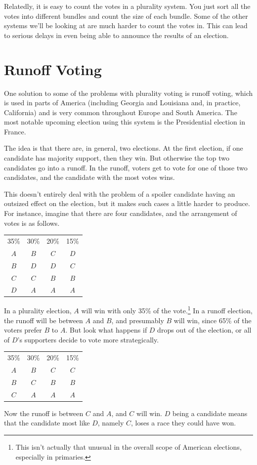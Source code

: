 \documentclass[openany]{book}
\begin{document}
Relatedly, it is easy to count the votes in a plurality system. You just sort all the votes into different bundles and count the size of each bundle. Some of the other systems we'll be looking at are much harder to count the votes in. This can lead to serious delays in even being able to announce the results of an election.

\section{Runoff Voting}
One solution to some of the problems with plurality voting is runoff voting, which is used in parts of America (including Georgia and Louisiana and, in practice, California) and is very common throughout Europe and South America. The most notable upcoming election using this system is the Presidential election in France. 

The idea is that there are, in general, two elections. At the first election, if one candidate has majority support, then they win. But otherwise the top two candidates go into a runoff. In the runoff, voters get to vote for one of those two candidates, and the candidate with the most votes wins.

This doesn't entirely deal with the problem of a spoiler candidate having an outsized effect on the election, but it makes such cases a little harder to produce. For instance, imagine that there are four candidates, and the arrangement of votes is as follows.

\begin{center}
\begin{tabular}{c c c c}
35\% & 30\% & 20\% & 15\% \\ 
$A$ & $B$ & $C$ & $D$ \\
$B$ & $D$ & $D$ & $C$ \\
$C$ & $C$ & $B$ & $B$ \\
$D$ & $A$ & $A$ & $A$
\end{tabular}
\end{center}
In a plurality election, $A$ will win with only 35\% of the vote.\footnote{This isn't actually that unusual in the overall scope of American elections, especially in primaries.} In a runoff election, the runoff will be between $A$ and $B$, and presumably $B$ will win, since 65\% of the voters prefer $B$ to $A$. But look what happens if $D$ drops out of the election, or all of $D$'s supporters decide to vote more strategically.

\begin{center}
\begin{tabular}{c c c c}
35\% & 30\% & 20\% & 15\% \\ 
$A$ & $B$ & $C$ & $C$ \\
$B$ & $C$ & $B$ & $B$ \\
$C$ & $A$ & $A$ & $A$ \\
\end{tabular}
\end{center}
Now the runoff is between $C$ and $A$, and $C$ will win. $D$ being a candidate means that the candidate most like $D$, namely $C$, loses a race they could have won.
\end{document}
